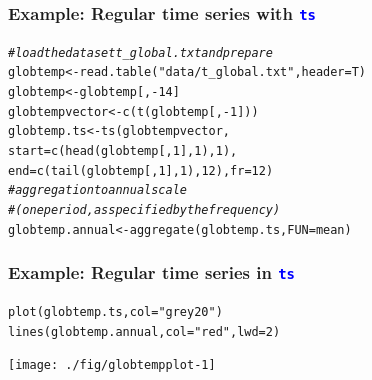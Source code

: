 \documentclass[xcolor=table, xcolor=dvipsnames]{beamer}\usepackage[]{graphicx}\usepackage[]{color}
\makeatletter
\newcommand{\hlnum}[1]{\textcolor[rgb]{0,0,0}{#1}}
\newcommand{\hlstr}[1]{\textcolor[rgb]{0.545,0.137,0.137}{#1}}
\newcommand{\hlcom}[1]{\textcolor[rgb]{0,0.392,0}{\textit{#1}}}
\newcommand{\hlopt}[1]{\textcolor[rgb]{0,0,0}{#1}}
\newcommand{\hlstd}[1]{\textcolor[rgb]{0,0,0}{#1}}
\newcommand{\hlkwb}[1]{\textcolor[rgb]{0,0,0}{#1}}
\newcommand{\hlkwc}[1]{\textcolor[rgb]{1,0,1}{#1}}
\newcommand{\hlkwd}[1]{\textcolor[rgb]{0,0,1}{#1}}
\newenvironment{kframe}{%
 \def\at@end@of@kframe{}%
 \ifinner\ifhmode%
  \def\at@end@of@kframe{\end{minipage}}%
  \begin{minipage}{\columnwidth}%
 \fi\fi%
 \def\FrameCommand##1{\hskip\@totalleftmargin \hskip-\fboxsep
 \colorbox{shadecolor}{##1}\hskip-\fboxsep
     \hskip-\linewidth \hskip-\@totalleftmargin \hskip\columnwidth}%
 \MakeFramed {\advance\hsize-\width
   \@totalleftmargin\z@ \linewidth\hsize
   \@setminipage}}%
 {\par\unskip\endMakeFramed%
 \at@end@of@kframe}
\newenvironment{knitrout}{}{} %
\newcommand{\rcode}[1]{\texttt{\textcolor{Blue}{#1}}} %
\makeatother
\begin{document}
\begin{frame}[fragile]\frametitle{Example: Regular time series with \rcode{ts}}  %
\begin{knitrout}
\color{fgcolor}\begin{kframe}
\begin{alltt}
\hlcom{# load the data set t_global.txt and prepare}
\hlstd{globtemp} \hlkwb{<-} \hlkwd{read.table}\hlstd{(}\hlstr{"data/t_global.txt"}\hlstd{,} \hlkwc{header}\hlstd{=T)}
\hlstd{globtemp} \hlkwb{<-} \hlstd{globtemp[,}\hlopt{-}\hlnum{14}\hlstd{]}
\hlstd{globtempvector} \hlkwb{<-} \hlkwd{c}\hlstd{(}\hlkwd{t}\hlstd{(globtemp[,}\hlopt{-}\hlnum{1}\hlstd{]))}
\hlstd{globtemp.ts} \hlkwb{<-} \hlkwd{ts}\hlstd{(globtempvector,}
                  \hlkwc{start}\hlstd{=}\hlkwd{c}\hlstd{(}\hlkwd{head}\hlstd{(globtemp[,}\hlnum{1}\hlstd{],}\hlnum{1}\hlstd{),}\hlnum{1}\hlstd{),}
                  \hlkwc{end}\hlstd{=}\hlkwd{c}\hlstd{(}\hlkwd{tail}\hlstd{(globtemp[,}\hlnum{1}\hlstd{],}\hlnum{1}\hlstd{),}\hlnum{12}\hlstd{),} \hlkwc{fr}\hlstd{=}\hlnum{12}\hlstd{)}
\hlcom{# aggregation to annual scale }
\hlcom{# (one period, as specified by the frequency)}
\hlstd{globtemp.annual} \hlkwb{<-} \hlkwd{aggregate}\hlstd{(globtemp.ts,} \hlkwc{FUN} \hlstd{= mean)}
\end{alltt}
\end{kframe}
\end{knitrout}
\end{frame}


\begin{frame}[fragile]\frametitle{Example: Regular time series in \rcode{ts}} %
\begin{knitrout}
\color{fgcolor}\begin{kframe}
\begin{alltt}
\hlkwd{plot}\hlstd{(globtemp.ts,} \hlkwc{col}\hlstd{=}\hlstr{"grey20"}\hlstd{)}
\hlkwd{lines}\hlstd{(globtemp.annual,} \hlkwc{col}\hlstd{=}\hlstr{"red"}\hlstd{,} \hlkwc{lwd}\hlstd{=}\hlnum{2}\hlstd{)}
\end{alltt}
\end{kframe}

{\centering \texttt{[image: ./fig/globtempplot-1]} 

}



\end{knitrout}
\end{frame}
\end{document}
